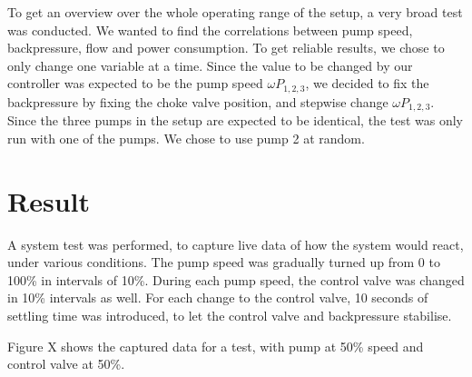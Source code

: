 To get an overview over the whole operating range of the setup,
a very broad test was conducted.
We wanted to find the correlations between pump speed, backpressure, flow and power consumption.
To get reliable results, we chose to only change one variable at a time.
Since the value to be changed by our controller was expected to be the pump speed $\omega P_{1,2,3}$,
we decided to fix the backpressure by fixing the choke valve position,
and stepwise change $\omega P_{1,2,3}$.
Since the three pumps in the setup are expected to be identical,
the test was only run with one of the pumps.
We chose to use pump 2 at random.

\section{Result}\label{sec:results}
A system test was performed, 
to capture live data of how the system would react, 
under various conditions.
The pump speed was gradually turned up from 0 to 100\% in intervals of 10\%. 
During each pump speed, the control valve was changed in 10\% intervals as well. 
For each change to the control valve, 
10 seconds of settling time was introduced, 
to let the control valve and backpressure stabilise.

Figure X shows the captured data for a test, with pump at 50\% speed and control valve at 50\%.

